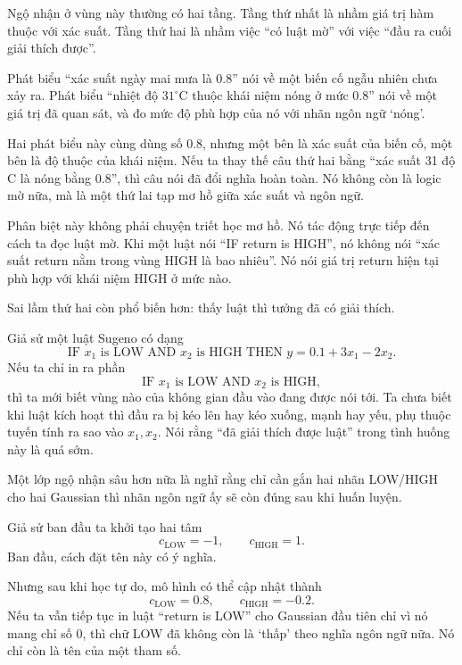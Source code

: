 Ngộ nhận ở vùng này thường có hai tầng. Tầng thứ nhất là nhầm giá trị hàm thuộc với xác suất. Tầng thứ hai là nhầm việc ``có luật mờ'' với việc ``đầu ra cuối giải thích được''.

\begin{example}
Phát biểu ``xác suất ngày mai mưa là 0.8'' nói về một biến cố ngẫu nhiên chưa xảy ra. Phát biểu ``nhiệt độ \(31^\circ\mathrm{C}\) thuộc khái niệm nóng ở mức 0.8'' nói về một giá trị đã quan sát, và đo mức độ phù hợp của nó với nhãn ngôn ngữ `nóng'.

Hai phát biểu này cùng dùng số 0.8, nhưng một bên là xác suất của biến cố, một bên là độ thuộc của khái niệm. Nếu ta thay thế câu thứ hai bằng ``xác suất 31 độ C là nóng bằng 0.8'', thì câu nói đã đổi nghĩa hoàn toàn. Nó không còn là logic mờ nữa, mà là một thứ lai tạp mơ hồ giữa xác suất và ngôn ngữ.
\end{example}

Phân biệt này không phải chuyện triết học mơ hồ. Nó tác động trực tiếp đến cách ta đọc luật mờ. Khi một luật nói ``IF return is HIGH'', nó không nói ``xác suất return nằm trong vùng HIGH là bao nhiêu''. Nó nói giá trị return hiện tại phù hợp với khái niệm HIGH ở mức nào.

Sai lầm thứ hai còn phổ biến hơn: thấy luật thì tưởng đã có giải thích.

\begin{example}
Giả sử một luật Sugeno có dạng
\[
\text{IF } x_1 \text{ is LOW AND } x_2 \text{ is HIGH THEN } y = 0.1 + 3x_1 - 2x_2.
\]
Nếu ta chỉ in ra phần
\[
\text{IF } x_1 \text{ is LOW AND } x_2 \text{ is HIGH},
\]
thì ta mới biết vùng nào của không gian đầu vào đang được nói tới. Ta chưa biết khi luật kích hoạt thì đầu ra bị kéo lên hay kéo xuống, mạnh hay yếu, phụ thuộc tuyến tính ra sao vào \(x_1,x_2\). Nói rằng ``đã giải thích được luật'' trong tình huống này là quá sớm.
\end{example}

Một lớp ngộ nhận sâu hơn nữa là nghĩ rằng chỉ cần gắn hai nhãn LOW/HIGH cho hai Gaussian thì nhãn ngôn ngữ ấy sẽ còn đúng sau khi huấn luyện.

\begin{example}
Giả sử ban đầu ta khởi tạo hai tâm
\[
c_{\mathrm{LOW}}=-1,\qquad c_{\mathrm{HIGH}}=1.
\]
Ban đầu, cách đặt tên này có ý nghĩa.

Nhưng sau khi học tự do, mô hình có thể cập nhật thành
\[
c_{\mathrm{LOW}}=0.8,\qquad c_{\mathrm{HIGH}}=-0.2.
\]
Nếu ta vẫn tiếp tục in luật ``return is LOW'' cho Gaussian đầu tiên chỉ vì nó mang chỉ số 0, thì chữ LOW đã không còn là `thấp' theo nghĩa ngôn ngữ nữa. Nó chỉ còn là tên của một tham số.
\end{example}

